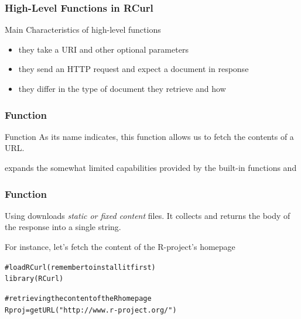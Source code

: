 \documentclass{beamer}\usepackage[]{graphicx}\usepackage[]{color}
\makeatletter
\newcommand{\hlstr}[1]{\textcolor[rgb]{0.063,0.58,0.627}{#1}}%
\newcommand{\hlcom}[1]{\textcolor[rgb]{0.588,0.588,0.588}{#1}}%
\newcommand{\hlstd}[1]{\textcolor[rgb]{0.196,0.196,0.196}{#1}}%
\newcommand{\hlkwb}[1]{\textcolor[rgb]{0.627,0,0.314}{#1}}%
\newcommand{\hlkwd}[1]{\textcolor[rgb]{0.78,0.227,0.412}{#1}}%
\newenvironment{kframe}{%
 \def\at@end@of@kframe{}%
 \ifinner\ifhmode%
  \def\at@end@of@kframe{\end{minipage}}%
  \begin{minipage}{\columnwidth}%
 \fi\fi%
 \def\FrameCommand##1{\hskip\@totalleftmargin \hskip-\fboxsep
 \colorbox{shadecolor}{##1}\hskip-\fboxsep
     \hskip-\linewidth \hskip-\@totalleftmargin \hskip\columnwidth}%
 \MakeFramed {\advance\hsize-\width
   \@totalleftmargin\z@ \linewidth\hsize
   \@setminipage}}%
 {\par\unskip\endMakeFramed%
 \at@end@of@kframe}
\newenvironment{knitrout}{}{} %
\makeatother
\begin{document}
\begin{frame}
\frametitle{High-Level Functions in RCurl}

\begin{block}{Main Characteristics of high-level functions}
\begin{itemize}
 \item they take a URI and other optional parameters
 \item they send an HTTP request and expect a document in response
 \item they differ in the type of document they retrieve and how
\end{itemize}
\end{block}

\end{frame}


\begin{frame}[fragile]
\frametitle{Function }

\begin{block}{Function }
As its name indicates, this function allows us to fetch the contents of a URL. 

\bigskip
{} expands the somewhat limited capabilities provided by the built-in functions  and 
\end{block}

\end{frame}


\begin{frame}[fragile]
\frametitle{Function }

\begin{block}{Using }
 downloads \textit{static or fixed content} files. It collects and returns the body of the response into a single string.

\bigskip
For instance, let's fetch the content of the R-project's homepage
\end{block}

\begin{knitrout}\tiny
{}\color{fgcolor}\begin{kframe}
\begin{alltt}
\hlcom{# load RCurl (remember to install it first)}
\hlkwd{library}\hlstd{(RCurl)}

\hlcom{# retrieving the content of the R homepage}
\hlstd{Rproj} \hlkwb{=} \hlkwd{getURL}\hlstd{(}\hlstr{"http://www.r-project.org/"}\hlstd{)}
\end{alltt}
\end{kframe}
\end{knitrout}


\end{frame}
\end{document}
